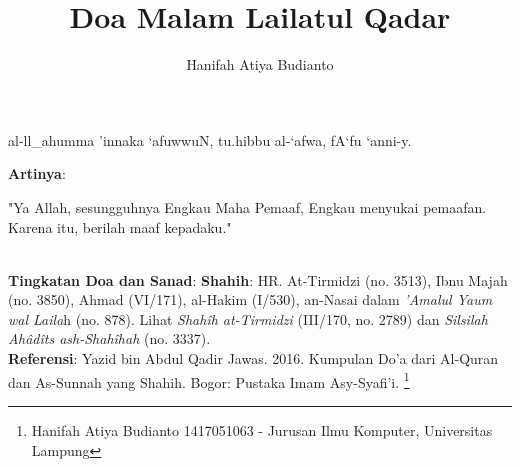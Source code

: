 \documentclass[a4paper,12pt]{article}
\title{\Large Doa Malam Lailatul Qadar}
\author{\calligra Hanifah Atiya Budianto}
\begin{document}
\sffamily
\maketitle 
\fullvocalize
{}
\begin{arabtext}
\noindent
al-ll_ahumma 'innaka `afuwwuN, tu.hibbu al-`afwa, fA`fu `anni-y.\\
\end{arabtext}
\noindent
\textbf{Artinya}:
\par
\indent
"Ya Allah, sesungguhnya Engkau Maha Pemaaf, Engkau menyukai pemaafan. 
Karena itu, berilah maaf kepadaku."\\\\
\par
\noindent
\textbf{Tingkatan Doa dan Sanad}: \textbf{Shahih}: HR. At-Tirmidzi (no. 
3513), Ibnu Majah (no. 3850), Ahmad (VI/171), al-Hakim (I/530), an-Nasai 
dalam \textit{'Amalul Yaum wal Laila}h (no. 878). Lihat \textit{Shah\^{i}h 
at-Tirmidzi} (III/170, no. 2789) dan \textit{Silsilah Ah\^{a}d\^{i}ts 
ash-Shah\^{i}hah} (no. 3337).\\
\textbf{Referensi}: Yazid bin Abdul Qadir Jawas. 2016. Kumpulan Do'a dari
Al-Quran dan As-Sunnah yang Shahih. Bogor: Pustaka Imam Asy-Syafi'i.
\footnote{Hanifah Atiya Budianto 1417051063 - Jurusan Ilmu Komputer,
Universitas Lampung}
\end{document}

